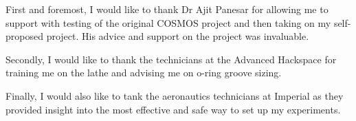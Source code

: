 First and foremost, I would like to thank Dr Ajit Panesar for allowing me to support with testing of the original COSMOS project and then taking on my self-proposed project. His advice and support on the project was invaluable. 

Secondly, I would like to thank the technicians at the Advanced Hackspace for training me on the lathe and advising me on o-ring groove sizing. 

Finally, I would also like to tank the aeronautics technicians at Imperial as they provided insight into the most effective and safe way to set up my experiments. 